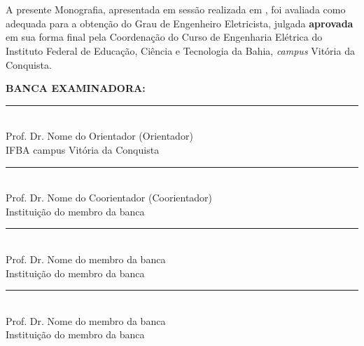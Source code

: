 

\clearpage\newpage\pagebreak%
\pagestyle{plain}
\begin{center}%
    \textbf{\Large \@Titulo  }\\%
    \vspace{1.2cm}%
    \MakeUppercase{\textbf{\Large \@Autor}}\\%
\end{center}%
\vspace{0.6cm}%

A presente Monografia, apresentada em sessão realizada em \textbf{ \@Data}, foi avaliada como adequada para a obtenção do Grau de Engenheiro Eletricista, julgada \textbf{aprovada} em sua forma final pela Coordenação do Curso de Engenharia Elétrica do Instituto Federal de Educação, Ciência e Tecnologia da Bahia, \textit{campus} Vitória da Conquista.

\begin{center}
    \textbf{\large BANCA EXAMINADORA:}\par
    
    \vspace{7mm}
    \rule[0cm]{10cm}{0,5mm}\\
    Prof. Dr. Nome do Orientador (Orientador)\\
    IFBA campus Vitória da Conquista\\

    \vspace{7mm}
    \rule[0cm]{10cm}{0,5mm}\\
    Prof. Dr. Nome do Coorientador (Coorientador)\\
    Instituição do membro da banca\\

    \vspace{7mm}
    \rule[0cm]{10cm}{0,5mm}\\
    Prof. Dr. Nome do membro da banca\\
    Instituição do membro da banca\\

    \vspace{7mm}
    \rule[0cm]{10cm}{0,5mm}\\
    Prof. Dr. Nome do membro da banca\\
    Instituição do membro da banca\\
    
\end{center}
  
  
\vfill %
\begin{center}%
    {\large  \@Cidade}\\%
    \vspace{1mm}%
    {\large  \@Data }%
\end{center}%
